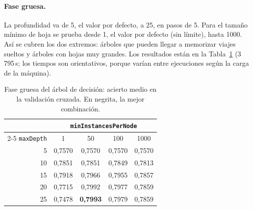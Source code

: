 \documentclass[12pt,a4paper]{article}
\begin{document}
\paragraph{Fase gruesa.} La profundidad va de 5, el valor por defecto, a
25, en pasos de 5. Para el tamaño mínimo de hoja se prueba desde 1, el valor
por defecto (sin límite), hasta 1000. Así se cubren los dos extremos:
árboles que pueden llegar a memorizar viajes sueltos y árboles con hojas muy
grandes. Los resultados están en la Tabla~\ref{tab:dt-fase1} (3\,795\,s; los
tiempos son orientativos, porque varían entre ejecuciones según la carga de
la máquina).
 
\begin{table}[H]
\centering
\small
\begin{tabular}{rcccc}
\toprule
 & \multicolumn{4}{c}{\texttt{minInstancesPerNode}} \\
\cmidrule(lr){2-5}
\texttt{maxDepth} & 1 & 50 & 100 & 1000 \\
\midrule
5  & 0,7570 & 0,7570 & 0,7570 & 0,7570 \\
10 & 0,7851 & 0,7851 & 0,7849 & 0,7813 \\
15 & 0,7918 & 0,7966 & 0,7955 & 0,7857 \\
20 & 0,7715 & 0,7992 & 0,7977 & 0,7859 \\
25 & 0,7478 & \textbf{0,7993} & 0,7979 & 0,7859 \\
\bottomrule
\end{tabular}
\caption{Fase gruesa del árbol de decisión: acierto medio en la validación
cruzada. En negrita, la mejor combinación.}
\label{tab:dt-fase1}
\end{table}
 
\end{document}
